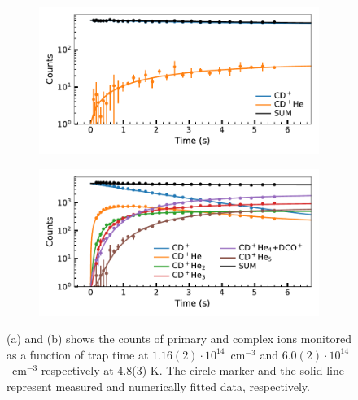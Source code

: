 \begin{figure}[!htb]

    \centering

    \begin{subfigure}[b]{0.49\textwidth}
        \centering
        \includegraphics[width=1\textwidth]{figures/measurements/kinetics/off_kinetics_1.16_2e+14.pdf}
        \caption{}
        
    \end{subfigure}
    \hfill
    \begin{subfigure}[b]{0.49\textwidth}
        \centering
        \includegraphics[width=1\textwidth]{figures/measurements/kinetics/off_kinetics_6.04_25e+14.pdf}
        \caption{}
        
    \end{subfigure}
    
    \caption{(a) and (b) shows the counts of primary and complex ions monitored as a function of trap time at  $ 1.16(2)\cdot10^{14}$~cm$^{-3}$ and  $6.0(2)\cdot10^{14}$~cm$^{-3}$ respectively at 4.8(3) K. The circle marker and the solid line represent measured and numerically fitted data, respectively.}
    \label{fig:fit:rate-constants}

\end{figure}